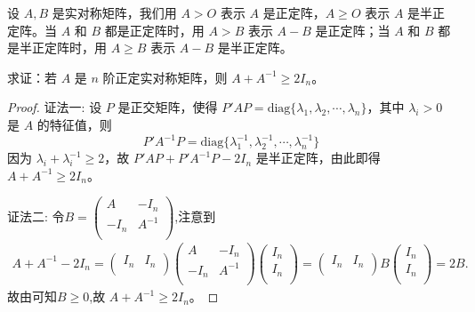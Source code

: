 \documentclass[../../main.tex]{subfiles}%
\begin{document}
\begin{definition}[正定阵和半正定阵的记号]
设 \(A,B\) 是实对称矩阵，我们用 \(A > O\) 表示 \(A\) 是正定阵，\(A \geqslant  O\) 表示 \(A\) 是半正定阵。当 \(A\) 和 \(B\) 都是正定阵时，用 \(A > B\) 表示 \(A - B\) 是正定阵；当 \(A\) 和 \(B\) 都是半正定阵时，用 \(A \geqslant  B\) 表示 \(A - B\) 是半正定阵。 
\end{definition}

\begin{example}\label{proposition:例9.59}
求证：若 \(A\) 是 \(n\) 阶正定实对称矩阵，则 \(A + A^{-1} \geqslant  2I_n\)。
\end{example}
\begin{proof}

{\color{blue}证法一:}
设 \(P\) 是正交矩阵，使得 \(P'AP = \mathrm{diag}\{\lambda_1,\lambda_2,\cdots,\lambda_n\}\)，其中 \(\lambda_i > 0\) 是 \(A\) 的特征值，则
\[
P'A^{-1}P = \mathrm{diag}\{\lambda_1^{-1},\lambda_2^{-1},\cdots,\lambda_n^{-1}\}
\]
因为 \(\lambda_i + \lambda_i^{-1} \geqslant  2\)，故 \(P'AP + P'A^{-1}P - 2I_n\) 是半正定阵，由此即得 \(A + A^{-1} \geqslant  2I_n\)。

{\color{blue}证法二:}
令$B=\left( \begin{matrix}
A&		-I_n\\
-I_n&		A^{-1}\\
\end{matrix} \right) $,注意到
\begin{align*}
A+A^{-1}-2I_n=\left( \begin{matrix}
I_n&		I_n\\
\end{matrix} \right) \left( \begin{matrix}
A&		-I_n\\
-I_n&		A^{-1}\\
\end{matrix} \right) \left( \begin{array}{c}
I_n\\
I_n\\
\end{array} \right) =\left( \begin{matrix}
I_n&		I_n\\
\end{matrix} \right) B\left( \begin{array}{c}
I_n\\
I_n\\
\end{array} \right) =2B.
\end{align*}
故由可知$B\geqslant  0$,故 \(A + A^{-1} \geqslant  2I_n\)。 

\end{proof}
\end{document}

